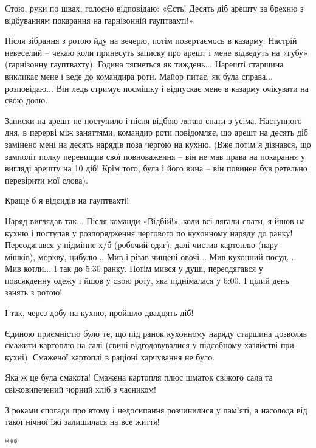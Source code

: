 Стою, руки по швах, голосно відповідаю: «Єсть! Десять діб арешту за брехню з
відбуванням покарання на гарнізонній гауптвахті!»

Після зібрання з ротою йду на вечерю, потім повертаємось в казарму. Настрій
невеселий – чекаю коли принесуть записку про арешт і мене відведуть на «губу»
(гарнізонну гауптвахту). Година тягнеться як тиждень... Нарешті старшина викликає
мене і веде до командира роти. Майор питає, як була справа... розповідаю... Він
ледь стримує посмішку і відпускає мене в казарму очікувати на свою долю.

Записки на арешт не поступило і після відбою лягаю спати з усіма. Наступного
дня, в перерві між заняттями, командир роти повідомляє, що арешт на десять діб
замінено мені на десять нарядів поза чергою на кухню. (Вже потім я дізнався, що
замполіт полку перевищив свої повноваження – він не мав права на покарання у
вигляді арешту на 10 діб! Крім того, була і його вина – він повинен був
ретельно перевірити мої слова).

Краще б я відсидів на гауптвахті! 

Наряд виглядав так... Після команди «Відбій!», коли всі лягали спати, я йшов на
кухню і поступав у розпорядження чергового по кухонному наряду до ранку!
Переодягався у підмінне х/б (робочий одяг), далі чистив картоплю (пару мішків),
моркву, цибулю... Мив і різав чищені овочі... Мив кухонний посуд... Мив котли... І так
до 5:30 ранку. Потім мився у душі, переодягався у повсякденну одежу і йшов у
свою роту, яка  піднімалася у 6:00. І цілий день занять з ротою! 

І так, через добу на кухню, пройшло двадцять діб!

Єдиною приємністю було те, що під ранок кухонному наряду старшина дозволяв
смажити картоплю на салі (свині відгодовувалися у підсобному хазяйстві при
кухні). Смаженої картоплі в раціоні харчування не було. 

Яка ж це була смакота! Смажена картопля плюс шматок свіжого сала та
свіжовипечений чорний хліб з часником!

З роками спогади про втому і недосипання розчинилися у пам’яті, а насолода від
такої нічної їжі залишилася на все життя!

***


